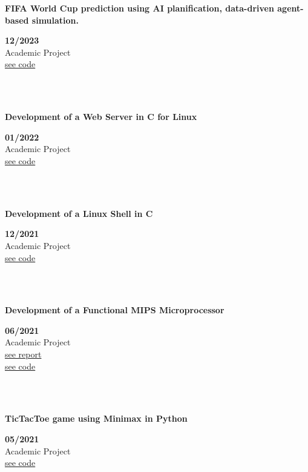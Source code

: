 \documentclass{article}
\begin{document}
\begin{minipage}{0.8\textwidth}
\parbox{0.8\linewidth}{\textbf{FIFA World Cup prediction using AI planification, data-driven agent-based simulation.}}  \hfill  \textbf{12/2023}\\
Academic Project\\
\href{https://github.com/geeksLabTech/FIFA_World_Cup_2022}{see code}\\
\end{minipage} \hfill {}\\\\
\begin{minipage}{0.8\textwidth}
\parbox{0.8\linewidth}{\textbf{Development of a Web Server in C for Linux}} \hfill \textbf{01/2022}\\
Academic Project\\
\href{https://github.com/geeksLabTech/web_server}{see code}\\
\end{minipage} \hfill {}\\\\
\begin{minipage}{0.8\textwidth}
\parbox{0.8\linewidth}{\textbf{Development of a Linux Shell in C}} \hfill \textbf{12/2021}\\
Academic Project\\
\href{https://github.com/geeksLabTech/SO_Shell}{see code}\\
\end{minipage} \hfill {}\\\\
\begin{minipage}{0.8\textwidth}
\parbox{0.8\linewidth}{\textbf{Development of a Functional MIPS Microprocessor}} \hfill \textbf{06/2021}\\
Academic Project\\
\href{https://github.com/JavierOramas/MIPS-Micro/blob/master/informe.pdf}{see report}\\
\href{https://github.com/JavierOramas/MIPS-Micro}{see code}\\
\end{minipage} \hfill {}\\\\
\begin{minipage}{0.8\textwidth}
\parbox{0.8\linewidth}{\textbf{TicTacToe game using Minimax in Python}} \hfill \textbf{05/2021}\\
Academic Project\\
\href{https://github.com/JavierOramas/TicTacToe_AI}{see code}\\
\end{minipage} \hfill {}\\\\
\end{document}
